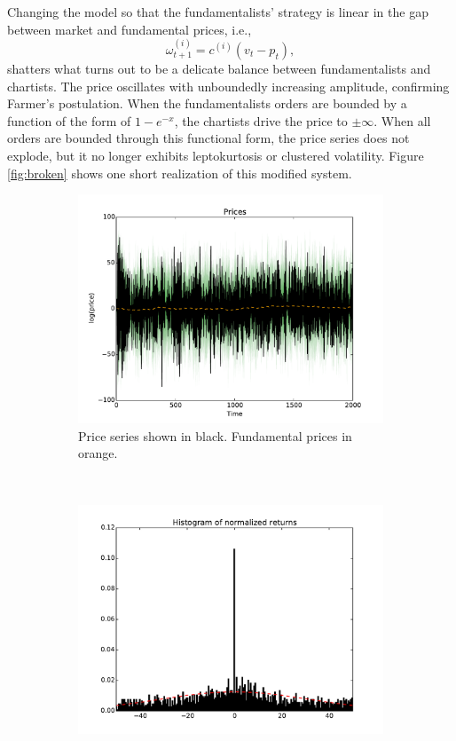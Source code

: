 \documentclass{article}
\begin{document}
Changing the model so that the fundamentalists' strategy is linear in the gap between market and fundamental prices, i.e.,
$$
\omega_{t+1}^{(i)}=c^{(i)}(v_t-p_t),
$$
shatters what turns out to be a delicate balance between fundamentalists and chartists. The price oscillates with unboundedly increasing amplitude, confirming Farmer's postulation. When the fundamentalists orders are bounded by a function of the form of $1-e^{-x}$, the chartists drive the price to $\pm\infty$. When all orders are bounded through this functional form, the price series does not explode, but it no longer exhibits leptokurtosis or clustered volatility. Figure \ref{fig:broken} shows one short realization of this modified system.
\begin{figure}[h]
  \centering
  \begin{subfigure}[b]{0.48\textwidth}
    \includegraphics[width=\textwidth]{images/broken_prices.pdf}
    \caption{Price series shown in black. Fundamental prices in orange.}
  \end{subfigure}
  ~
  \begin{subfigure}[b]{0.48\textwidth}
    \includegraphics[width=\textwidth]{images/broken_hist.pdf}

\end{subfigure}
\end{figure}
\end{document}
